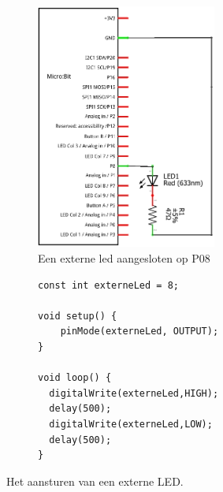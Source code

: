 \begin{figure}[H]
	\centering
	\begin{center} 	
		\begin{subfigure}[b]{0.43\textwidth}
			\includegraphics[width=0.65\textwidth]{figuren/externeLedCr}
			\caption{Een externe led aangesloten op P08 }
			\label{fig:exLd}
			
		\end{subfigure}
		\begin{subfigure}[b]{0.46\textwidth}
\begin{lstlisting}[caption={Het aansturen van een externe LED.},label={lst:extLd1}]
const int externeLed = 8;
			
void setup() {
	pinMode(externeLed, OUTPUT);  
}
				
void loop() {
  digitalWrite(externeLed,HIGH);
  delay(500);
  digitalWrite(externeLed,LOW);
  delay(500); 
}
\end{lstlisting}
		\end{subfigure}
		\captionsetup{justification=centering}
		\caption{Het aansturen van een externe LED. }
		\label{fig:vbExtld}
	\end{center}	
\end{figure}

